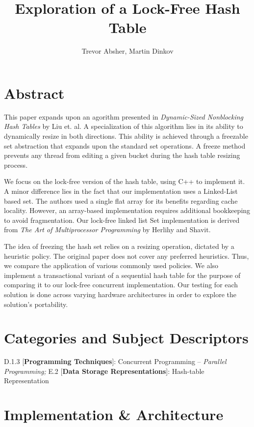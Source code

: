 \documentclass[11pt]{article} %
\title{Exploration of a Lock-Free Hash Table}
\author{Trevor Absher, Martin Dinkov}
\begin{document}
\maketitle

\section{Abstract}

This paper expands upon an agorithm presented in \textit{Dynamic-Sized Nonblocking Hash Tables} by Liu et. al. A specialization of this algorithm lies in its ability to dynamically resize in both directions. This ability is achieved through a freezable set abstraction that expands upon the standard set operations. A freeze method prevents any thread from editing a given bucket during the hash table resizing process.

We focus on the lock-free version of the hash table, using C++ to implement it. A minor difference lies in the fact that our implementation uses a Linked-List based set. The authors used a single flat array for its benefits regarding cache locality. However, an array-based implementation requires additional bookkeeping to avoid fragmentation. Our lock-free linked list Set implementation is derived from \textit{The Art of Multiprocessor Programming} by Herlihy and Shavit.

The idea of freezing the hash set relies on a resizing operation, dictated by a heuristic policy. The original paper does not cover any preferred heuristics. Thus, we compare the application of various commonly used policies. We also implement a transactional variant of a sequential hash table for the purpose of comparing it to our lock-free concurrent implementation. Our testing for each solution is done across varying hardware architectures in order to explore the solution's portability.

\section{Categories and Subject Descriptors}

D.1.3 [\textbf{Programming Techniques}]: Concurrent Programming -- \textit{Parallel Programming;} E.2 [\textbf{Data Storage Representations}]: Hash-table Representation

\section{Implementation \& Architecture}
\end{document}
